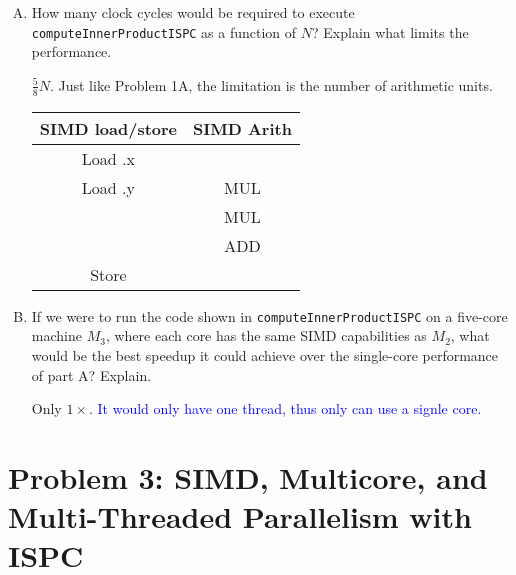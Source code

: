 \documentclass[11pt]{article}
\newenvironment{choice}{\begin{enumerate}[A.]}{\end{enumerate}}
\newenvironment{answer}{\begin{minipage}[c][1.5in]{\textwidth}}{\end{minipage}}
\begin{document}
\begin{choice}
\item
  How
  many clock cycles would be required to execute
  \texttt{computeInnerProductISPC} as a function of $N$?
  Explain what limits the performance.

\begin{answer}

$\frac{5}{8}N$. Just like Problem 1A, the limitation is the number of arithmetic units.  \\
\begin{tabular}{cc}
  \toprule
  SIMD load/store & SIMD Arith\\
  \midrule
  Load .x\\
  Load .y & MUL\\
  &MUL\\
  &ADD\\
  Store\\
  \bottomrule
\end{tabular}

\end{answer}

\item  If we were to run the code shown in \texttt{computeInnerProductISPC} on a five-core
  machine $M_3$, where each core has the same SIMD capabilities as $M_2$,
  what would be the best speedup it could achieve over the single-core performance of part A?  Explain.

\begin{answer}
Only $1\times$. \textcolor{blue}{It would only have one thread, thus only can use a signle core. }

\end{answer}
\end{choice}

\newpage
\section*{Problem 3: SIMD, Multicore, and Multi-Threaded Parallelism with ISPC}
\end{document}
